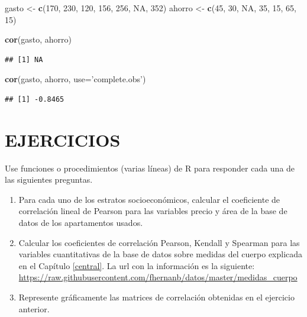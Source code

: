 \documentclass[10pt,]{krantz}
\makeatletter
\newenvironment{Shaded}{\begin{snugshade}}{\end{snugshade}}
\newcommand{\KeywordTok}[1]{\textcolor[rgb]{0.13,0.29,0.53}{\textbf{#1}}}
\newcommand{\DataTypeTok}[1]{\textcolor[rgb]{0.13,0.29,0.53}{#1}}
\newcommand{\DecValTok}[1]{\textcolor[rgb]{0.00,0.00,0.81}{#1}}
\newcommand{\StringTok}[1]{\textcolor[rgb]{0.31,0.60,0.02}{#1}}
\newcommand{\OtherTok}[1]{\textcolor[rgb]{0.56,0.35,0.01}{#1}}
\newcommand{\NormalTok}[1]{#1}
\let\proglang=\textsf
\newenvironment{kframe}{%
\medskip{}
\setlength{\fboxsep}{.8em}
 \def\at@end@of@kframe{}%
 \ifinner\ifhmode%
  \def\at@end@of@kframe{\end{minipage}}%
  \begin{minipage}{\columnwidth}%
 \fi\fi%
 \def\FrameCommand##1{\hskip\@totalleftmargin \hskip-\fboxsep
 \colorbox{shadecolor}{##1}\hskip-\fboxsep
     \hskip-\linewidth \hskip-\@totalleftmargin \hskip\columnwidth}%
 \MakeFramed {\advance\hsize-\width
   \@totalleftmargin\z@ \linewidth\hsize
   \@setminipage}}%
 {\par\unskip\endMakeFramed%
 \at@end@of@kframe}
\renewenvironment{Shaded}{\begin{kframe}}{\end{kframe}}
\makeatother
\begin{document}
\begin{Shaded}
\begin{Highlighting}[]
\NormalTok{gasto <-}\StringTok{ }\KeywordTok{c}\NormalTok{(}\DecValTok{170}\NormalTok{, }\DecValTok{230}\NormalTok{, }\DecValTok{120}\NormalTok{, }\DecValTok{156}\NormalTok{, }\DecValTok{256}\NormalTok{, }\OtherTok{NA}\NormalTok{, }\DecValTok{352}\NormalTok{)}
\NormalTok{ahorro <-}\StringTok{ }\KeywordTok{c}\NormalTok{(}\DecValTok{45}\NormalTok{, }\DecValTok{30}\NormalTok{, }\OtherTok{NA}\NormalTok{, }\DecValTok{35}\NormalTok{, }\DecValTok{15}\NormalTok{, }\DecValTok{65}\NormalTok{, }\DecValTok{15}\NormalTok{)}

\KeywordTok{cor}\NormalTok{(gasto, ahorro)}
\end{Highlighting}
\end{Shaded}

\begin{verbatim}
## [1] NA
\end{verbatim}

\begin{Shaded}
\begin{Highlighting}[]
\KeywordTok{cor}\NormalTok{(gasto, ahorro, }\DataTypeTok{use=}\StringTok{'complete.obs'}\NormalTok{)}
\end{Highlighting}
\end{Shaded}

\begin{verbatim}
## [1] -0.8465
\end{verbatim}

\section*{EJERCICIOS}\label{ejercicios-5}


Use funciones o procedimientos (varias líneas) de \proglang{R} para
responder cada una de las siguientes preguntas.

\begin{enumerate}
\def\labelenumi{\arabic{enumi}.}
\item
  Para cada uno de los estratos socioeconómicos, calcular el coeficiente
  de correlación lineal de Pearson para las variables precio y área de
  la base de datos de los apartamentos usados.
\item
  Calcular los coeficientes de correlación Pearson, Kendall y Spearman
  para las variables cuantitativas de la base de datos sobre medidas del
  cuerpo explicada en el Capítulo \ref{central}. La url con la
  información es la siguiente:
  \url{https://raw.githubusercontent.com/fhernanb/datos/master/medidas_cuerpo}
\item
  Represente gráficamente las matrices de correlación obtenidas en el
  ejercicio anterior.
\end{enumerate}
\end{document}
